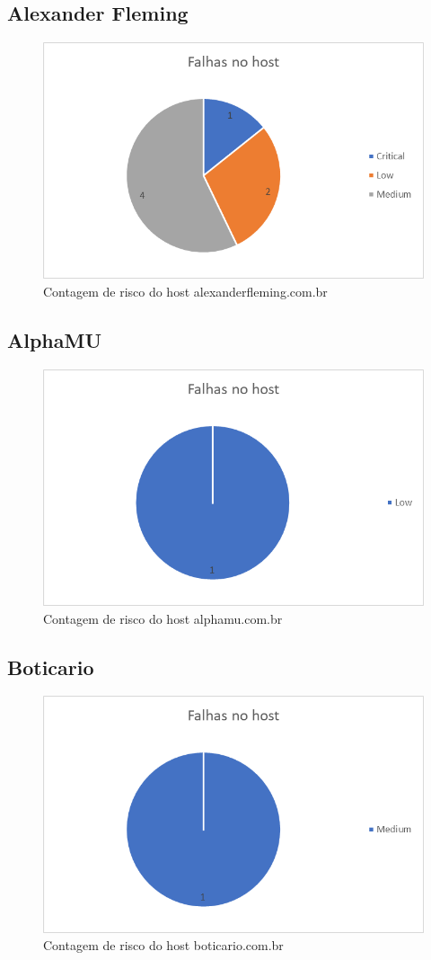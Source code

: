 \documentclass[
	12pt,				%
	openright,			%
	twoside,			%
	a4paper,			%
	english,			%
	french,				%
	spanish,			%
	brazil				%
	]{abntex2}
\begin{document}
\subsection{Alexander Fleming}
\begin{figure}[h]
	\centering
	\includegraphics[width=0.7\linewidth]{Imagens/AlexanderFleming}
	\caption[Alexander Fleming]{Contagem de risco do host alexanderfleming.com.br}
	\label{fig:alexanderfleming}
\end{figure}

\subsection{AlphaMU}
\begin{figure}[h]
	\centering
	\includegraphics[width=0.7\linewidth]{Imagens/AlphaMU}
	\caption[AlphaMu]{Contagem de risco do host alphamu.com.br}
	\label{fig:alphamu}
\end{figure}

\subsection{Boticario}
\begin{figure}[h]
	\centering
	\includegraphics[width=0.7\linewidth]{Imagens/Boticario}
	\caption[Boticario]{Contagem de risco do host boticario.com.br}
	\label{fig:boticario}
\end{figure}
\end{document}
